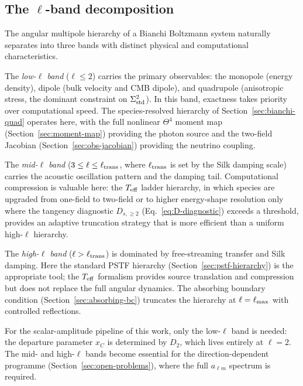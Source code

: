 \subsection{The $\ell$-band decomposition}
\label{sec:ell-band}

The angular multipole hierarchy of a Bianchi Boltzmann
system naturally separates into three bands with distinct
physical and computational characteristics.

The \emph{low-$\ell$ band} ($\ell \leq 2$) carries the
primary observables: the monopole (energy density), dipole
(bulk velocity and CMB dipole), and quadrupole (anisotropic
stress, the dominant constraint on $\Sigma^2_{\mathrm{std}}$).  In this
band, exactness takes priority over computational speed.
The species-resolved hierarchy of
Section~\ref{sec:bianchi-quad} operates here, with the
full nonlinear $\Theta^4$ moment map
(Section~\ref{sec:moment-map}) providing the photon
source and the two-field Jacobian
(Section~\ref{sec:obs-jacobian}) providing the neutrino
coupling.

The \emph{mid-$\ell$ band} ($3 \leq \ell \leq
\ell_{\rm trans}$, where $\ell_{\rm trans}$ is set by
the Silk damping scale) carries the acoustic oscillation
pattern and the damping tail.  Computational compression
is valuable here: the $T_{\mathrm{eff}}$ ladder hierarchy, in which
species are upgraded from one-field to two-field or to
higher energy-shape resolution only where the tangency
diagnostic $D_{s,\geq 2}$
(Eq.~\ref{eq:D-diagnostic}) exceeds a threshold,
provides an adaptive truncation strategy that is more
efficient than a uniform high-$\ell$ hierarchy.

The \emph{high-$\ell$ band} ($\ell > \ell_{\rm trans}$)
is dominated by free-streaming transfer and Silk damping.
Here the standard PSTF hierarchy
(Section~\ref{sec:pstf-hierarchy}) is the appropriate
tool; the $T_{\mathrm{eff}}$ formalism provides source translation
and compression but does not replace the full angular
dynamics.  The absorbing boundary condition
(Section~\ref{sec:absorbing-bc}) truncates the hierarchy
at $\ell = \ell_{\rm max}$ with controlled reflections.

For the scalar-amplitude pipeline of this work, only the
low-$\ell$ band is needed: the departure parameter
$x_C$ is determined by $D_2$, which lives entirely at
$\ell = 2$.  The mid- and high-$\ell$ bands become
essential for the direction-dependent programme
(Section~\ref{sec:open-problems}), where the full
$a_{\ell m}$ spectrum is required.


